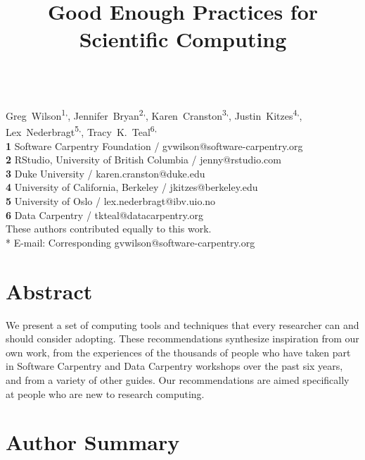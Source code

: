 \documentclass[10pt,letterpaper]{article}
\date{}
\begin{document}
\vspace*{0.2in}

\begin{flushleft}
{\Large
\textbf{}
}
\newline
\\
{Greg~Wilson}\textsuperscript{1,\ddag *},
{Jennifer~Bryan}\textsuperscript{2,\ddag},
{Karen~Cranston}\textsuperscript{3,\ddag},
{Justin~Kitzes}\textsuperscript{4,\ddag},
{Lex~Nederbragt}\textsuperscript{5,\ddag},
{Tracy~K.~Teal}\textsuperscript{6,\ddag}
\\
\textbf{1} Software Carpentry Foundation / gvwilson@software-carpentry.org
\\
\textbf{2} RStudio, University of British Columbia / jenny@rstudio.com
\\
\textbf{3} Duke University / karen.cranston@duke.edu
\\
\textbf{4} University of California, Berkeley / jkitzes@berkeley.edu
\\
\textbf{5} University of Oslo / lex.nederbragt@ibv.uio.no
\\
\textbf{6} Data Carpentry / tkteal@datacarpentry.org
\\
\bigskip
{\ddag} These authors contributed equally to this work.
\\
* E-mail: Corresponding gvwilson@software-carpentry.org

\end{flushleft}

\title{Good Enough Practices for Scientific Computing}

\section*{Abstract}

We present a set of computing tools and techniques that every
researcher can and should consider adopting.  These recommendations
synthesize inspiration from our own work, from the experiences of the
thousands of people who have taken part in Software Carpentry and Data
Carpentry workshops over the past six years, and from a variety of
other guides.  Our recommendations are aimed specifically at people
who are new to research computing.

\section*{Author Summary}
\end{document}
